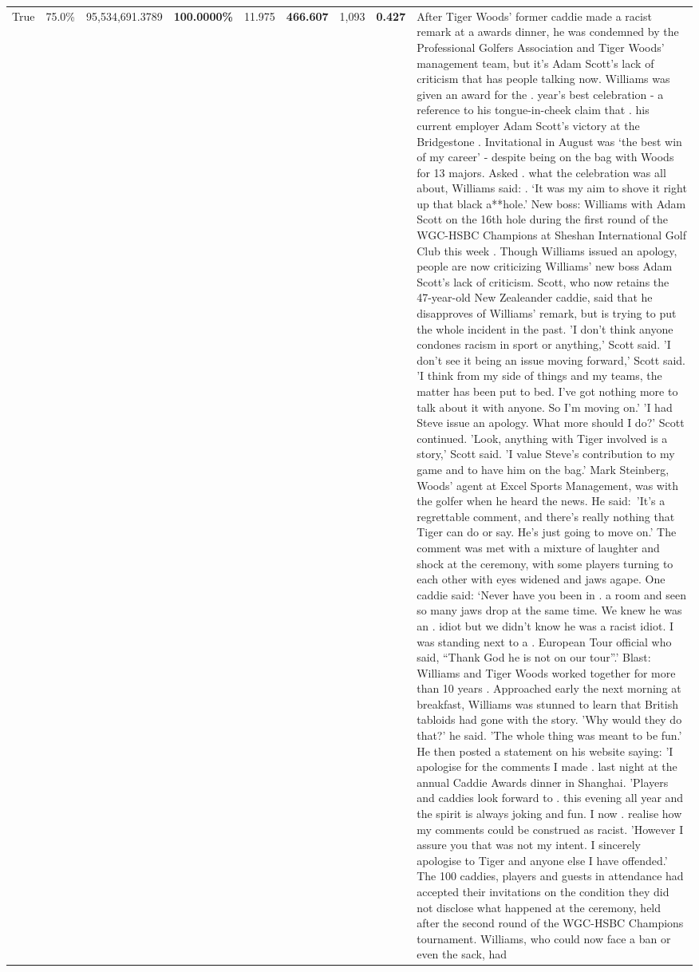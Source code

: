 \begin{table}[H]
\begin{tabular}{lllrlllll}
True & 75.0\% & 95,534,691.3789 & \bfseries \color{red} 100.0000\% & 11.975 & \bfseries \color{red} 466.607 & 1,093 & \bfseries \color{red} 0.427 & After Tiger Woods' former caddie made a racist remark at a awards dinner, he was condemned by the Professional Golfers Association and Tiger Woods' management team, but it's Adam Scott's lack of criticism that has people talking now. Williams was given an award for the . year’s best celebration - a reference to his tongue-in-cheek claim that . his current employer Adam Scott’s victory at the Bridgestone . Invitational in August was ‘the best win of my career’ - despite being on the bag with Woods for 13 majors. Asked . what the celebration was all about, Williams said: . ‘It was my aim to shove it right up that black a**hole.’ New boss: Williams with Adam Scott  on the 16th hole during the first round of the WGC-HSBC Champions at Sheshan International Golf Club this week . Though Williams issued an apology, people are now criticizing Williams' new boss Adam Scott's lack of criticism. Scott, who now retains the 47-year-old New Zealeander caddie, said that he disapproves of Williams' remark, but is trying to put the whole incident in the past. 'I don't think anyone condones racism in sport or anything,' Scott said. 'I don't see it being an issue moving forward,' Scott said. 'I think from my side of things and my teams, the matter has been put to bed. I've got nothing more to talk about it with anyone. So I'm moving on.' 'I had Steve issue an apology. What more should I do?' Scott continued. 'Look, anything with Tiger involved is a story,' Scott said. 'I value Steve's contribution to my game and to have him on the bag.' Mark Steinberg, Woods' agent at Excel Sports Management, was with the golfer when he heard the news. He said: 'It's a regrettable comment, and there's really nothing that Tiger can do or say. He's just going to move on.' The comment was met with a mixture of laughter and shock at the ceremony, with some players turning to each other with eyes widened and jaws agape. One caddie said: ‘Never have you been in . a room and seen so many jaws drop at the same time. We knew he was an . idiot but we didn’t know he was a racist idiot. I was standing next to a . European Tour official who said, “Thank God he is not on our tour”.’ Blast: Williams and Tiger Woods worked together for more than 10 years . Approached early the next morning at breakfast, Williams was stunned to learn that British tabloids had gone with the story. 'Why would they do that?' he said. 'The whole thing was meant to be fun.' He then posted a statement on his website saying: 'I apologise for the comments I made . last night at the annual Caddie Awards dinner in Shanghai. 'Players and caddies look forward to . this evening all year and the spirit is always joking and fun. I now . realise how my comments could be construed as racist. 'However I assure you that was not my intent. I sincerely apologise to Tiger and anyone else I have offended.' The 100 caddies, players and guests in attendance had accepted their invitations on the condition they did not disclose what happened at the ceremony, held after the second round of the WGC-HSBC Champions tournament. Williams, who could now face a ban or even the sack, had 
\end{tabular}
\end{table}
